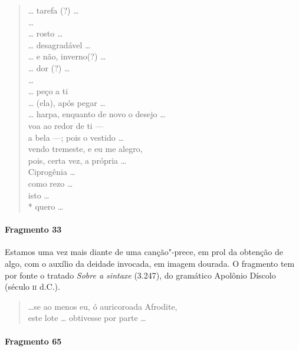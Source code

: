 \begin{verse}
\ldots{} tarefa (?) \ldots{}\\
\ldots{}\\ 
\ldots{}  rosto \ldots{}\\  
\ldots{}  desagradável \ldots{}\\
\ldots{}  e não, inverno(?) \ldots{}\\
\ldots{}  dor (?) \ldots{}\\
\ldots{}\\ 
\ldots{}  peço a ti\\
\ldots{}  (ela), após pegar \ldots{}\\
\ldots{} harpa, enquanto de novo o desejo \ldots{}\\
voa ao redor de ti ---\\
a bela ---; pois o vestido \ldots{}\\
vendo tremeste, e eu me alegro,\\
pois, certa vez, a própria \ldots{} \\
Ciprogênia \ldots{}\\
como rezo \ldots{}\\
isto \ldots{}\\*
quero \ldots{}\\
\end{verse}

\paragraph{Fragmento 33}

{\small Estamos uma vez mais diante de uma canção"-prece, em prol da obtenção de algo,
com o auxílio da deidade invocada, em imagem dourada. O fragmento tem por fonte
o tratado \textit{Sobre a sintaxe} (3.247), do gramático Apolônio Díscolo (século
\textsc{ii} d.C.).}

\begin{verse}
\ldots{}se ao menos eu, ó auricoroada Afrodite,\\
este lote \ldots{} obtivesse por parte \ldots{}
\end{verse}


\paragraph{Fragmento 65}

